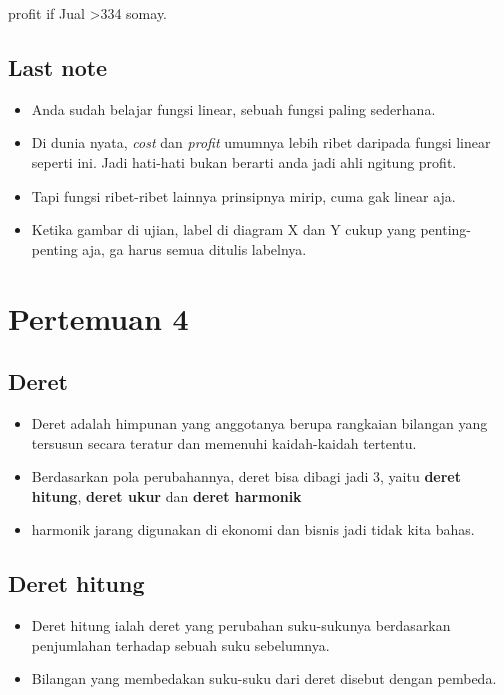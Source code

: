 \documentclass[
  letterpaper,
  DIV=11,
  numbers=noendperiod]{scrartcl}
\begin{document}
profit if Jual \textgreater334 somay.

\hypertarget{last-note}{%
\subsection{Last note}\label{last-note}}

\begin{itemize}
\item
  Anda sudah belajar fungsi linear, sebuah fungsi paling sederhana.
\item
  Di dunia nyata, \emph{cost} dan \emph{profit} umumnya lebih ribet
  daripada fungsi linear seperti ini. Jadi hati-hati bukan berarti anda
  jadi ahli ngitung profit.
\item
  Tapi fungsi ribet-ribet lainnya prinsipnya mirip, cuma gak linear aja.
\item
  Ketika gambar di ujian, label di diagram X dan Y cukup yang
  penting-penting aja, ga harus semua ditulis labelnya.
\end{itemize}

\hypertarget{pertemuan-4}{%
\section{Pertemuan 4}\label{pertemuan-4}}

\hypertarget{deret}{%
\subsection{Deret}\label{deret}}

\begin{itemize}
\item
  Deret adalah himpunan yang anggotanya berupa rangkaian bilangan yang
  tersusun secara teratur dan memenuhi kaidah-kaidah tertentu.
\item
  Berdasarkan pola perubahannya, deret bisa dibagi jadi 3, yaitu
  \textbf{deret hitung}, \textbf{deret ukur} dan \textbf{deret harmonik}
\item
  harmonik jarang digunakan di ekonomi dan bisnis jadi tidak kita bahas.
\end{itemize}

\hypertarget{deret-hitung}{%
\subsection{Deret hitung}\label{deret-hitung}}

\begin{itemize}
\item
  Deret hitung ialah deret yang perubahan suku-sukunya berdasarkan
  penjumlahan terhadap sebuah suku sebelumnya.
\item
  Bilangan yang membedakan suku-suku dari deret disebut dengan pembeda.
\end{itemize}
\end{document}
